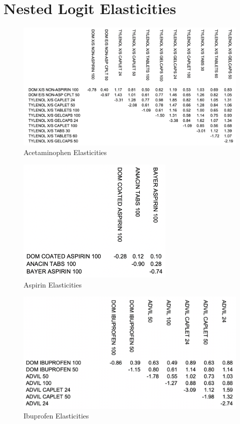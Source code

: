 \documentclass[12pt, authoryear]{elsarticle}
\begin{document}
\section{Nested Logit Elasticities} \label{app2}

\begin{figure}[H]
	\centering
	\includegraphics[clip, angle=0, width=1\textwidth]{elas1}
	\caption{Acetaminophen Elasticities }\label{elas1}
\end{figure}

\begin{figure}[H]
	\centering
	\includegraphics[clip, angle=0, width=7.5cm]{elas2}
	\caption{Aspirin Elasticities }\label{elas2}
\end{figure}


\begin{figure}[H]
	\centering
	\includegraphics[clip, angle=0, width=12cm]{elas3}
	\caption{Ibuprofen Elasticities }\label{elas3}
\end{figure}
\end{document}
